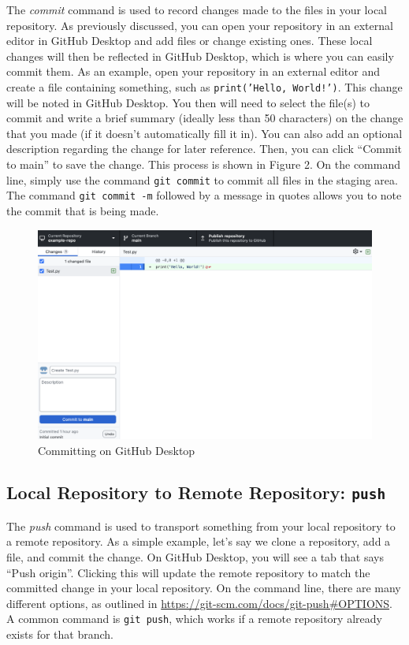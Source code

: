 \documentclass[10pt,twocolumn]{article}
\begin{document}
The \textit{commit} command is used to record changes made to the files in your local repository. As previously discussed, you can open your repository in an external editor in GitHub Desktop and add files or change existing ones. These local changes will then be reflected in GitHub Desktop, which is where you can easily commit them. As an example, open your repository in an external editor and create a file containing something, such as \texttt{print('Hello, World!')}. This change will be noted in GitHub Desktop. You then will need to select the file(s) to commit and write a brief summary (ideally less than 50 characters) on the change that you made (if it doesn’t automatically fill it in). You can also add an optional description regarding the change for later reference. Then, you can click “Commit to main” to save the change. This process is shown in Figure 2. On the command line, simply use the command \texttt{git commit} to commit all files in the staging area. The command \texttt{git commit -m} followed by a message in quotes allows you to note the commit that is being made. 

\begin{figure}
    \centering
    \includegraphics[width=.95\linewidth]{commit.png}
    \caption{
        Committing on GitHub Desktop
    }
    \label{fig:first-page}
\end{figure}

\subsection{Local Repository to Remote Repository: \texttt{push}}

The \textit{push} command is used to transport something from your local repository to a remote repository. As a simple example, let’s say we clone a repository, add a file, and commit the change. On GitHub Desktop, you will see a tab that says “Push origin”. Clicking this will update the remote repository to match the committed change in your local repository. On the command line, there are many different options, as outlined in \url{https://git-scm.com/docs/git-push#OPTIONS}. A common command is \texttt{git push}, which works if a remote repository already exists for that branch.
\end{document}
